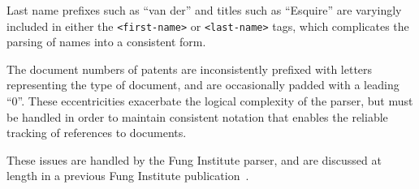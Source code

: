 Last name prefixes such as ``van der'' and titles such as ``Esquire'' are varyingly included in either the \verb`<first-name>` or \verb`<last-name>` tags, which complicates the parsing of names into a consistent form.

The document numbers of patents are inconsistently prefixed with letters representing the type of document, and are occasionally padded with a leading ``0''. These eccentricities exacerbate the logical complexity of the parser, but must be handled in order to maintain consistent notation that enables the reliable tracking of references to documents.

These issues are handled by the Fung Institute parser, and are discussed at length in a previous Fung Institute publication~\cite{formattingpatentdata}.